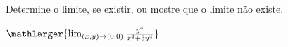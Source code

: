 Determine o limite, se existir, ou mostre que o limite não existe.

$\mathlarger{\lim_{(x,y)\rightarrow(0,0)} \frac{y^4}{x^4+3y^4}}$